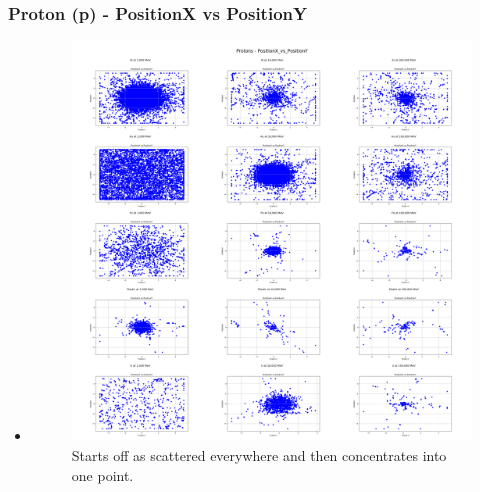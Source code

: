 \documentclass[aspectratio-169]{beamer}
\begin{document}

\begin{frame}
\frametitle{Proton (p) - PositionX vs PositionY}
\begin{itemize}
    \item 
    \begin{minipage}{0.5\textwidth}
        \begin{figure}
            \centering
            \includegraphics[width=\textwidth]{Combined Plots/PositionX_vs_PositionY_p.png}
            \footnotesize{Starts off as scattered everywhere and then concentrates into one point.}
        \end{figure}
    \end{minipage}
\end{itemize}
\end{frame}

\end{document}
